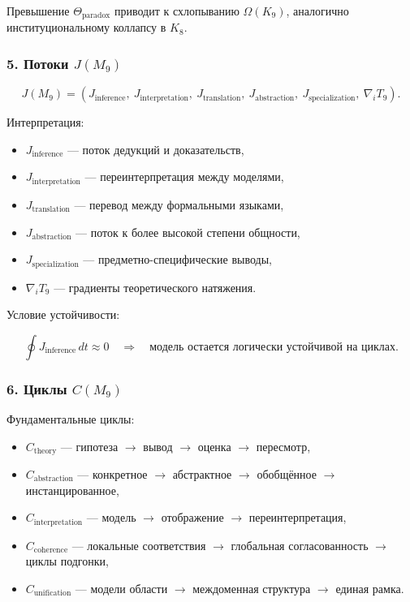 Превышение $\Theta_{\mathrm{paradox}}$ приводит к схлопыванию $\Omega(K_9)$,
аналогично институциональному коллапсу в $K_8$.

\subsubsection*{5. Потоки \texorpdfstring{$J(M_9)$}{J(M_9)}}

\[
J(M_9)=
(J_{\mathrm{inference}},\
J_{\mathrm{interpretation}},\
J_{\mathrm{translation}},\
J_{\mathrm{abstraction}},\
J_{\mathrm{specialization}},\
\nabla_i T_9).
\]

Интерпретация:

\begin{itemize}
    \item $J_{\mathrm{inference}}$ — поток дедукций и доказательств,
    \item $J_{\mathrm{interpretation}}$ — переинтерпретация между моделями,
    \item $J_{\mathrm{translation}}$ — перевод между формальными языками,
    \item $J_{\mathrm{abstraction}}$ — поток к более высокой степени общности,
    \item $J_{\mathrm{specialization}}$ — предметно-специфические выводы,
    \item $\nabla_i T_9$ — градиенты теоретического натяжения.
\end{itemize}

Условие устойчивости:

\[
\oint J_{\mathrm{inference}}\,dt\approx 0
\quad\Rightarrow\quad
\text{модель остается логически устойчивой на циклах}.
\]

\subsubsection*{6. Циклы \texorpdfstring{$C(M_9)$}{C(M_9)}}

Фундаментальные циклы:

\begin{itemize}
    \item $C_{\mathrm{theory}}$
        — гипотеза $\to$ вывод $\to$ оценка $\to$ пересмотр,
    \item $C_{\mathrm{abstraction}}$
        — конкретное $\to$ абстрактное $\to$ обобщённое $\to$ инстанцированное,
    \item $C_{\mathrm{interpretation}}$
        — модель $\to$ отображение $\to$ переинтерпретация,
    \item $C_{\mathrm{coherence}}$
        — локальные соответствия $\to$ глобальная согласованность $\to$ циклы подгонки,
    \item $C_{\mathrm{unification}}$
        — модели области $\to$ междоменная структура $\to$ единая рамка.
\end{itemize}

